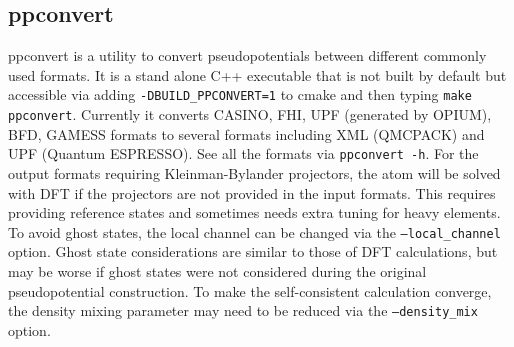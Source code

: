   \subsection{ppconvert}
    \label{sec:ppconvert}
    ppconvert is a utility to convert pseudopotentials between different commonly used formats.
    It is a stand alone C++ executable that is not built by default but accessible via adding
    \texttt{-DBUILD\_PPCONVERT=1} to cmake and then typing \texttt{make ppconvert}.
    Currently it converts CASINO, FHI, UPF (generated by OPIUM), BFD, GAMESS formats to several formats
    including XML (QMCPACK) and UPF (Quantum ESPRESSO). See all the formats via \texttt{ppconvert -h}.
    For the output formats requiring Kleinman-Bylander projectors, the atom will be solved with DFT
    if the projectors are not provided in the input formats.
    This requires providing reference states and sometimes needs extra tuning for heavy elements.
    To avoid ghost states, the local channel can be changed via the \texttt{--local\_channel} option. Ghost state considerations are similar to those of DFT calculations, but may be worse if ghost states were not considered during the original pseudopotential construction.
    To make the self-consistent calculation converge, the density mixing parameter may need to be reduced
    via the \texttt{--density\_mix} option.

